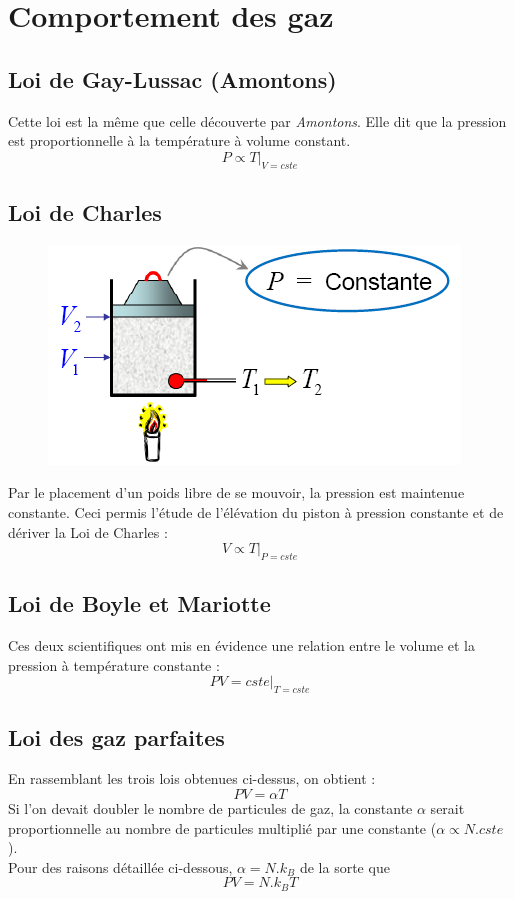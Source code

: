 \documentclass	[11pt, a4paper, openany]{book}
\begin{document}
\section{Comportement des gaz}
\subsection{Loi de Gay-Lussac (Amontons)}
Cette loi est la même que celle découverte par \textit{Amontons}. Elle dit que la pression est proportionnelle à la température à volume constant.
\begin{equation}
P \propto T|_{V = cste}
\end{equation}

\subsection{Loi de Charles}
\begin{figure}
\includegraphics[scale=0.23]{th/image5.png}
\end{figure}
Par le placement d'un poids libre de se mouvoir, la pression est maintenue constante. Ceci permis l'étude de l'élévation du piston à pression constante et de dériver la Loi de Charles :
\begin{equation}
V \propto T|_{P = cste}
\end{equation}

\subsection{Loi de Boyle et Mariotte}
Ces deux scientifiques ont mis en évidence une relation entre le volume et la pression à température constante :
\begin{equation}
PV = cste|_{T = cste}
\end{equation}

\subsection{Loi des gaz parfaites}
En rassemblant les trois lois obtenues ci-dessus, on obtient : 
\begin{equation}
PV = \alpha T
\end{equation}
Si l'on devait doubler le nombre de particules de gaz, la constante $\alpha$ serait proportionnelle au nombre de particules multiplié par une constante ($\alpha \propto N.cste$).\\
Pour des raisons détaillée ci-dessous, $\alpha = N.k_B$ de la sorte que
\begin{equation}
PV = N.k_BT
\end{equation}
\end{document}
